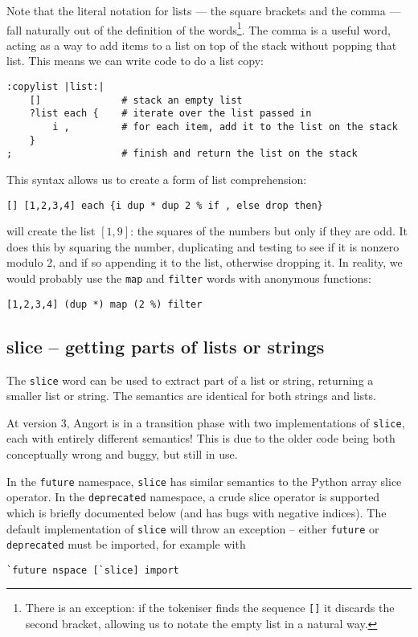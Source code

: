 Note that the literal notation for lists --- the square brackets and the
comma --- fall naturally out of the definition of the words\footnote{There
is an exception: if the tokeniser finds the sequence \texttt{[]} it discards
the second bracket, allowing us to notate the empty list in a natural way.}.
The comma
is a useful word, acting as a way to add items to a list on top of the stack
without popping that list. This means we can write code to do a list copy:
\begin{lstlisting}
:copylist |list:|
    []              # stack an empty list
    ?list each {    # iterate over the list passed in
        i ,         # for each item, add it to the list on the stack
    }
;                   # finish and return the list on the stack          
\end{lstlisting}
This syntax allows us to create a form of list comprehension:
\begin{lstlisting}
[] [1,2,3,4] each {i dup * dup 2 % if , else drop then}
\end{lstlisting}
will create the list $[1,9]$: the squares of the numbers but only 
if they are odd. It does this by squaring the number, duplicating and
testing to see if it is nonzero modulo 2, and if so appending it to the list,
otherwise dropping it. 
In reality, we would probably use the \texttt{map} and
\texttt{filter} words with anonymous functions:
\begin{lstlisting}
[1,2,3,4] (dup *) map (2 %) filter
\end{lstlisting}


\subsection{slice -- getting parts of lists or strings}
The \texttt{slice} word can be used to extract part of a list or string,
returning a smaller list or string. The semantics are identical for both
strings and lists.

At version 3, Angort is in a transition
phase with two implementations of \texttt{slice}, each with entirely different
semantics! This is due to the older code being both conceptually wrong
and buggy, but still in use. 

In the \texttt{future} namespace, \texttt{slice} has similar semantics
to the Python array slice operator. In the \texttt{deprecated} namespace,
a crude slice operator is supported which is briefly documented below
(and has bugs with negative indices). The default implementation of \texttt{slice} will
throw an exception -- either \texttt{future} or \texttt{deprecated} must
be imported, for example with
\begin{lstlisting}
`future nspace [`slice] import
\end{lstlisting}


